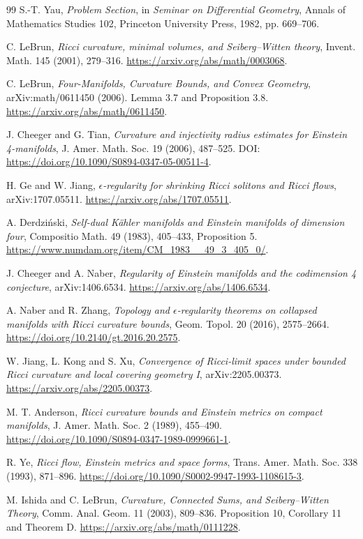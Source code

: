 \documentclass[a4paper,11pt]{article}
\numberwithin{equation}{section}
\theoremstyle{definition}
\begin{document}
\begin{thebibliography}{99}
 S.-T. Yau, \emph{Problem Section}, in \emph{Seminar on Differential Geometry}, Annals of Mathematics Studies 102, Princeton University Press, 1982, pp. 669--706.

 C. LeBrun, \emph{Ricci curvature, minimal volumes, and Seiberg--Witten theory}, Invent. Math. 145 (2001), 279--316. \url{https://arxiv.org/abs/math/0003068}.

 C. LeBrun, \emph{Four-Manifolds, Curvature Bounds, and Convex Geometry}, arXiv:math/0611450 (2006). Lemma 3.7 and Proposition 3.8. \url{https://arxiv.org/abs/math/0611450}.

 J. Cheeger and G. Tian, \emph{Curvature and injectivity radius estimates for Einstein 4-manifolds}, J. Amer. Math. Soc. 19 (2006), 487--525. DOI: \url{https://doi.org/10.1090/S0894-0347-05-00511-4}.

 H. Ge and W. Jiang, \emph{$\epsilon$-regularity for shrinking Ricci solitons and Ricci flows}, arXiv:1707.05511. \url{https://arxiv.org/abs/1707.05511}.

 A. Derdzi\'nski, \emph{Self-dual K\"ahler manifolds and Einstein manifolds of dimension four}, Compositio Math. 49 (1983), 405--433, Proposition 5. \url{https://www.numdam.org/item/CM_1983__49_3_405_0/}.

 J. Cheeger and A. Naber, \emph{Regularity of Einstein manifolds and the codimension 4 conjecture}, arXiv:1406.6534. \url{https://arxiv.org/abs/1406.6534}.

 A. Naber and R. Zhang, \emph{Topology and $\epsilon$-regularity theorems on collapsed manifolds with Ricci curvature bounds}, Geom. Topol. 20 (2016), 2575--2664. \url{https://doi.org/10.2140/gt.2016.20.2575}.

 W. Jiang, L. Kong and S. Xu, \emph{Convergence of Ricci-limit spaces under bounded Ricci curvature and local covering geometry I}, arXiv:2205.00373. \url{https://arxiv.org/abs/2205.00373}.

 M. T. Anderson, \emph{Ricci curvature bounds and Einstein metrics on compact manifolds}, J. Amer. Math. Soc. 2 (1989), 455--490. \url{https://doi.org/10.1090/S0894-0347-1989-0999661-1}.

 R. Ye, \emph{Ricci flow, Einstein metrics and space forms}, Trans. Amer. Math. Soc. 338 (1993), 871--896. \url{https://doi.org/10.1090/S0002-9947-1993-1108615-3}.

 M. Ishida and C. LeBrun, \emph{Curvature, Connected Sums, and Seiberg--Witten Theory}, Comm. Anal. Geom. 11 (2003), 809--836. Proposition 10, Corollary 11 and Theorem D. \url{https://arxiv.org/abs/math/0111228}.

\end{thebibliography}
\end{document}
